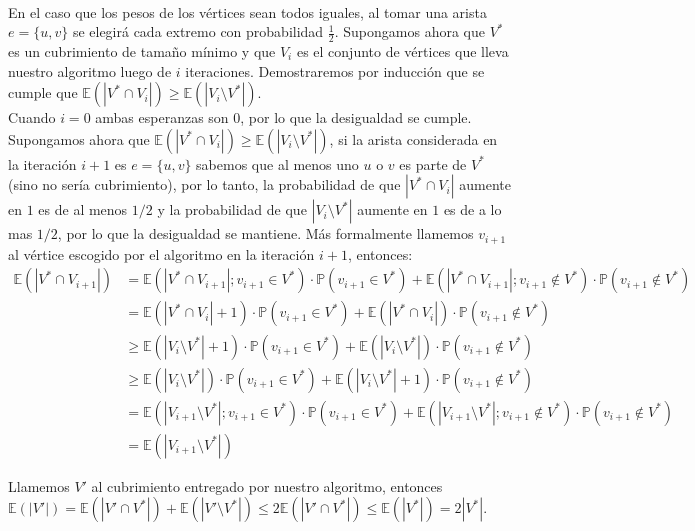 \documentclass[dcc,uchile]{fcfmcourse}
\theoremstyle{plain}
\theoremstyle{definition}
\begin{document}
\newpage
\begin{problems}
\\
En el caso que los pesos de los vértices sean todos iguales, al tomar una arista $e = \{u,v\}$ se elegirá cada extremo con probabilidad $\frac{1}{2}$. Supongamos ahora que $V^*$ es un cubrimiento de tamaño mínimo y que $V_{i}$ es el conjunto de vértices que lleva nuestro algoritmo luego de $i$ iteraciones. Demostraremos por inducción que se cumple que $\mathbb{E}(|V^* \cap V_{i}|) \ge \mathbb{E}(|V_{i}\setminus V^*|)$.\\

Cuando $i=0$ ambas esperanzas son $0$, por lo que la desigualdad se cumple. Supongamos ahora que $\mathbb{E}(|V^* \cap V_{i}|) \ge \mathbb{E}(|V_{i}\setminus V^*|)$, si la arista considerada en la iteración $i+1$ es $e = \{u,v\}$ sabemos que al menos uno $u$ o $v$ es parte de $V^*$ (sino no sería cubrimiento), por lo tanto, la probabilidad de que $|V^* \cap V_{i}|$ aumente en $1$ es de al menos $1/2$ y la probabilidad de que $|V_{i} \setminus V^*|$ aumente en $1$ es de a lo mas $1/2$, por lo que la desigualdad se mantiene. Más formalmente llamemos $v_{i+1}$ al vértice escogido por el algoritmo en la iteración $i+1$, entonces:
\begin{align*}
    \mathbb{E}(|V^* \cap V_{i+1}|) &= \mathbb{E}(|V^* \cap V_{i+1}|; v_{i+1} \in V^*)\cdot \mathbb{P}(v_{i+1}\in V^*) + \mathbb{E}(|V^* \cap V_{i+1}|; v_{i+1} \not\in V^*)\cdot \mathbb{P}(v_{i+1}\not\in V^*)\\
    &= \mathbb{E}(|V^* \cap V_{i}|+1)\cdot \mathbb{P}(v_{i+1}\in V^*) + \mathbb{E}(|V^* \cap V_{i}|)\cdot \mathbb{P}(v_{i+1}\not\in V^*)\\
    & \ge \mathbb{E}(|V_{i} \setminus V^*|+1)\cdot \mathbb{P}(v_{i+1}\in V^*) + \mathbb{E}(|V_{i} \setminus V^*|)\cdot \mathbb{P}(v_{i+1}\not\in V^*)\\
    & \ge \mathbb{E}(|V_{i} \setminus V^*|)\cdot \mathbb{P}(v_{i+1}\in V^*) + \mathbb{E}(|V_{i} \setminus V^*|+1)\cdot \mathbb{P}(v_{i+1}\not\in V^*)\\
    &= \mathbb{E}(|V_{i+1} \setminus V^*|; v_{i+1} \in V^*)\cdot \mathbb{P}(v_{i+1}\in V^*) + \mathbb{E}(|V_{i+1} \setminus V^*|; v_{i+1} \not\in V^*)\cdot \mathbb{P}(v_{i+1}\not\in V^*)\\
    &= \mathbb{E}(|V_{i+1} \setminus V^*|)
\end{align*}

Llamemos $V'$ al cubrimiento entregado por nuestro algoritmo, entonces $\mathbb{E}(|V'|) = \mathbb{E}(|V' \cap V^*|) + \mathbb{E}(|V' \setminus V^*|) \le 2 \mathbb{E}(|V' \cap V^*|) \le \mathbb{E}(|V^*|) = 2|V^*|$.


\end{problems}
\end{document}
